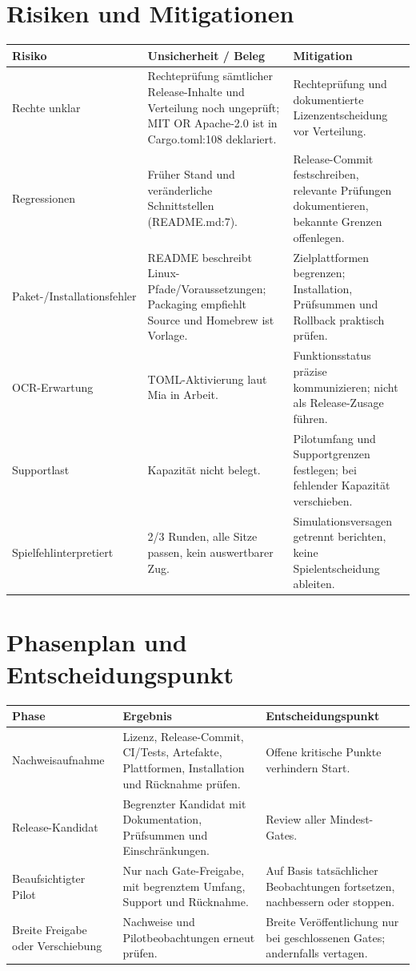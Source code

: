 \documentclass[11pt,a4paper]{scrartcl}
\begin{document}
\section{Risiken und Mitigationen}\label{sec:risiken}
\small
\begin{longtable}{@{}>{\raggedright}p{3.1cm}>{\raggedright}p{4.6cm}>{\raggedright\arraybackslash}p{7.3cm}@{}}
\toprule
\textbf{Risiko} & \textbf{Unsicherheit / Beleg} & \textbf{Mitigation} \\
\midrule\endhead
\bottomrule\endlastfoot
Rechte unklar & Rechteprüfung sämtlicher Release-Inhalte und Verteilung noch ungeprüft; MIT OR Apache-2.0 ist in Cargo.toml:108 deklariert. & Rechteprüfung und dokumentierte Lizenzentscheidung vor Verteilung. \\
Regressionen & Früher Stand und veränderliche Schnittstellen (README.md:7). & Release-Commit festschreiben, relevante Prüfungen dokumentieren, bekannte Grenzen offenlegen. \\
Paket-/Installations\allowbreak fehler & README beschreibt Linux-Pfade/Voraussetzungen; Packaging empfiehlt Source und Homebrew ist Vorlage. & Zielplattformen begrenzen; Installation, Prüfsummen und Rollback praktisch prüfen. \\
OCR-Erwartung & TOML-Aktivierung laut Mia in Arbeit. & Funktionsstatus präzise kommunizieren; nicht als Release-Zusage führen. \\
Supportlast & Kapazität nicht belegt. & Pilotumfang und Supportgrenzen festlegen; bei fehlender Kapazität verschieben. \\
Spiel\allowbreak fehlinterpretiert & 2/3 Runden, alle Sitze passen, kein auswertbarer Zug. & Simulationsversagen getrennt berichten, keine Spielentscheidung ableiten. \\
\end{longtable}
\normalsize

\section{Phasenplan und Entscheidungspunkt}\label{sec:plan}
\begin{tabularx}{\textwidth}{@{}>{\raggedright\arraybackslash}p{3.2cm}LL@{}}
\toprule
\textbf{Phase} & \textbf{Ergebnis} & \textbf{Entscheidungspunkt} \\
\midrule
Nachweis\-aufnahme & Lizenz, Release-Commit, CI/Tests, Artefakte, Plattformen, Installation und Rücknahme prüfen. & Offene kritische Punkte verhindern Start. \\
Release-Kandidat & Begrenzter Kandidat mit Dokumentation, Prüfsummen und Einschränkungen. & Review aller Mindest-Gates. \\
Beaufsichtigter Pilot & Nur nach Gate-Freigabe, mit begrenztem Umfang, Support und Rücknahme. & Auf Basis tatsächlicher Beobachtungen fortsetzen, nachbessern oder stoppen. \\
Breite Freigabe oder Verschiebung & Nachweise und Pilotbeobachtungen erneut prüfen. & Breite Veröffentlichung nur bei geschlossenen Gates; andernfalls vertagen. \\
\bottomrule
\end{tabularx}
\end{document}
